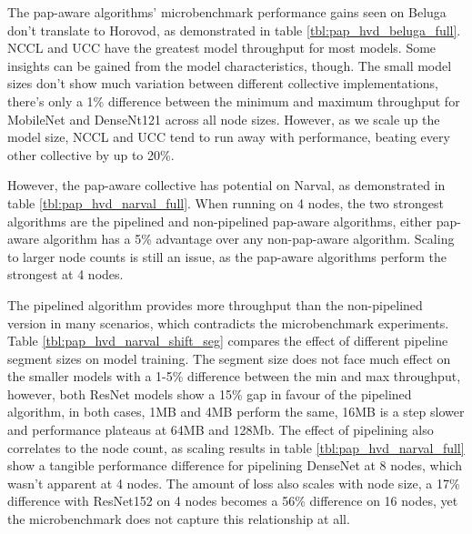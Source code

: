 

The pap-aware algorithms' microbenchmark performance gains seen on Beluga don't translate to Horovod, as demonstrated in table \ref{tbl:pap_hvd_beluga_full}.
NCCL and UCC have the greatest model throughput for most models.
Some insights can be gained from the model characteristics, though.
The small model sizes don't show much variation between different collective implementations, there's only a 1\% difference between the minimum and maximum throughput for MobileNet and DenseNt121 across all node sizes. 
However, as we scale up the model size, NCCL and UCC tend to run away with performance, beating every other collective by up to 20\%.




However, the pap-aware collective has potential on Narval, as demonstrated in table \ref{tbl:pap_hvd_narval_full}.
When running on 4 nodes, the two strongest algorithms are the pipelined and non-pipelined pap-aware algorithms, either pap-aware algorithm has a 5\% advantage over any non-pap-aware algorithm.
Scaling to larger node counts is still an issue, as the pap-aware algorithms perform the strongest at 4 nodes.

The pipelined algorithm provides more throughput than the non-pipelined version in many scenarios, which contradicts the microbenchmark experiments.
Table \ref{tbl:pap_hvd_narval_shift_seg} compares the effect of different pipeline segment sizes on model training.
The segment size does not face much effect on the smaller models with a 1-5\% difference between the min and max throughput, however, both ResNet models show a 15\% gap in favour of the pipelined algorithm, in both cases, 1MB and 4MB perform the same, 16MB is a step slower and performance plateaus at 64MB and 128Mb.
The effect of pipelining also correlates to the node count, as scaling results in table \ref{tbl:pap_hvd_narval_full} show a tangible performance difference for pipelining DenseNet at 8 nodes, which wasn't apparent at 4 nodes.
The amount of loss also scales with node size, a 17\% difference with ResNet152 on 4 nodes becomes a 56\% difference on 16 nodes, yet the microbenchmark does not capture this relationship at all.

